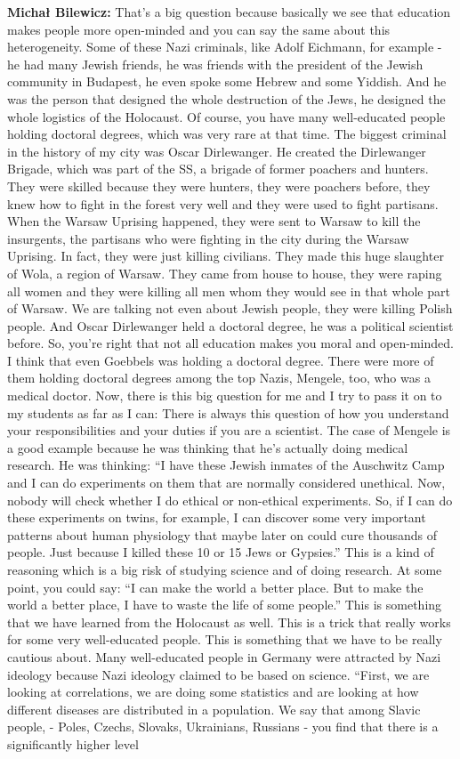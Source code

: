 \textbf{Michał Bilewicz:} That’s a big question because basically we see that education makes people more open-minded and you can say the same about this heterogeneity. Some of these Nazi criminals, like Adolf Eichmann, for example - he had many Jewish friends, he was friends with the president of the Jewish community in Budapest, he even spoke some Hebrew and some Yiddish. And he was the person that designed the whole destruction of the Jews, he designed the whole logistics of the Holocaust. Of course, you have many well-educated people holding doctoral degrees, which was very rare at that time. The biggest criminal in the history of my city was Oscar Dirlewanger. He created the Dirlewanger Brigade, which was part of the SS, a brigade of former poachers and hunters. They were skilled because they were hunters, they were poachers before, they knew how to fight in the forest very well and they were used to fight partisans. When the Warsaw Uprising happened, they were sent to Warsaw to kill the insurgents, the partisans who were fighting in the city during the Warsaw Uprising. In fact, they were just killing civilians. They made this huge slaughter of Wola, a region of Warsaw. They came from house to house, they were raping all women and they were killing all men whom they would see in that whole part of Warsaw. We are talking not even about Jewish people, they were killing Polish people. And Oscar Dirlewanger held a doctoral degree, he was a political scientist before. So, you're right that not all education makes you moral and open-minded. I think that even Goebbels was holding a doctoral degree. There were more of them holding doctoral degrees among the top Nazis, Mengele, too, who was a medical doctor. Now, there is this big question for me and I try to pass it on to my students as far as I can: There is always this question of how you understand your responsibilities and your duties if you are a scientist. The case of Mengele is a good example because he was thinking that he’s actually doing medical research. He was thinking: ``I have these Jewish inmates of the Auschwitz Camp and I can do experiments on them that are normally considered unethical. Now, nobody will check whether I do ethical or non-ethical experiments. So, if I can do these experiments on twins, for example, I can discover some very important patterns about human physiology that maybe later on could cure thousands of people. Just because I killed these 10 or 15 Jews or Gypsies.'' This is a kind of reasoning which is a big risk of studying science and of doing research. At some point, you could say: ``I can make the world a better place. But to make the world a better place, I have to waste the life of some people.'' This is something that we have learned from the Holocaust as well. This is a trick that really works for some very well-educated people. This is something that we have to be really cautious about. Many well-educated people in Germany were attracted by Nazi ideology because Nazi ideology claimed to be based on science. ``First, we are  looking at correlations, we are doing some statistics and are looking at how different diseases are distributed in a population. We say that among Slavic people, - Poles, Czechs, Slovaks, Ukrainians, Russians - you find that there is a significantly higher level 